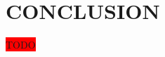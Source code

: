 \documentclass[12pt, conference]{ieeeconf}
\newcommand{\todo}{\colorbox{red}{TODO}}
\begin{document}
\begin{figure}[H]
	\centering
	\label{fig:single_num}
\end{figure}

\section{CONCLUSION}

\todo



\printbibliography
\end{document}
